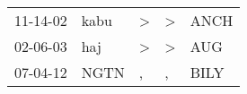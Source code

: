 \begin{supertabular}{lllll}
 11-14-02 &  kabu &  \textgreater &  \textgreater &  ANCH \\
 02-06-03 &   haj &  \textgreater &  \textgreater &   AUG \\
 07-04-12 &  NGTN &             , &             , &  BILY \\
\end{supertabular}
